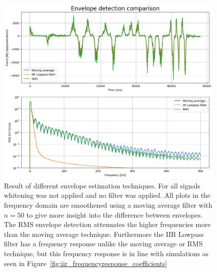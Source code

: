 \begin{figure}[h!t]
	\begin{center}
		\includegraphics[width=1.0\columnwidth]{images/measurement_envelopes.png}
	\end{center}
	\caption{Result of different envelope estimation techniques. For all signals whitening was not applied and no filter was applied. All plots in the frequency domain are smoothened using a moving average filter with $n=50$ to give more insight into the difference between envelopes. The RMS envelope detection attenuates the higher frequencies more than the moving average technique. Furthermore the IIR Lowpass filter has a frequency response unlike the moving average or RMS technique, but this frequency response is in line with simulations as seen in Figure~\ref{fig:iir_frequencyresponse_coefficients}}
	\label{fig:result_envelopes}
\end{figure}
